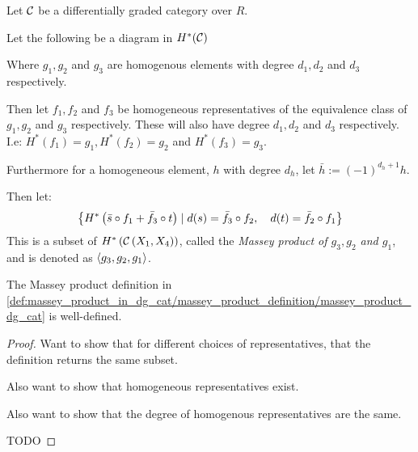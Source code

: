 \begin{definition}
    \label{def:massey_product_in_dg_cat/massey_product_definition/massey_product_dg_cat}
    Let \( {\mathcal{C}} \) be a differentially graded category over \( R \).

    Let the following be a diagram in \( H^*({\mathcal{C}}) \)
    \begin{center}
    \end{center}

    Where \( g_1, g_2 \) and \( g_3 \) are homogenous elements with degree \( d_1, d_2 \) and \( d_3 \) respectively.

    Then let \( f_1, f_2 \) and \( f_3 \) be homogeneous representatives of the equivalence class of \( g_1, g_2 \) and \( g_3 \) respectively. These will also have degree \( d_1, d_2 \) and \( d_3 \) respectively. I.e: \( H^*(f_1) = g_1, H^*(f_2) = g_2 \) and \( H^*(f_3) = g_3 \).

    Furthermore for a homogeneous element, \( h \) with degree \( d_h \), let \( \bar{h} := (-1)^{d_h + 1}h \).

    Then let:
    \[
        \left\{ 
            H^* \left( 
                \bar{s} \circ f_1 + \bar{f_3} \circ t
             \right)
            \mid
            d(s) = \bar{f_3} \circ f_2, \quad
            d(t) = \bar{f_2} \circ f_1
         \right\}
    \]
    This is a subset of \( H^* \left( {\mathcal{C}} \left( X_1, X_4 \right) \right) \), called the \emph{Massey product of \( g_3, g_2 \) and \( g_1 \)}, and is denoted as \( \langle g_3, g_2, g_1  \rangle \).
\end{definition}

\begin{theorem}
    The Massey product definition in \autoref{def:massey_product_in_dg_cat/massey_product_definition/massey_product_dg_cat} is well-defined.
\end{theorem}
\begin{proof}
    Want to show that for different choices of representatives, that the definition returns the same subset.

    Also want to show that homogeneous representatives exist.

    Also want to show that the degree of homogenous representatives are the same.

    TODO
\end{proof}

